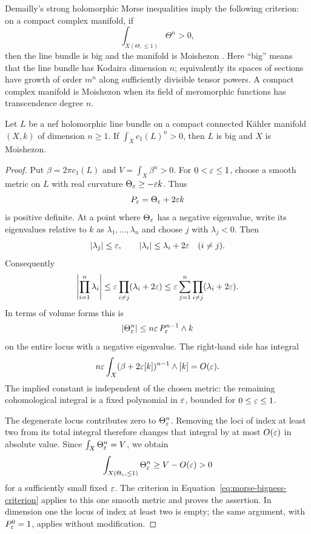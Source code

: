 Demailly's strong holomorphic Morse inequalities
\cite[Theorem~0.1 and Equation~(0.7)]{Demailly1985} imply the following
criterion: on a compact complex manifold, if
\begin{equation}
\label{eq:morse-bigness-criterion}
 \int_{X(\Theta,\le1)}\Theta^n>0,
\end{equation}
then the line bundle is big and the manifold is Moishezon
\cite[Theorem~0.8(a)]{Demailly1985}.  Here ``big'' means that the
line bundle has Kodaira dimension $n$; equivalently its spaces of
sections have growth of order $m^n$ along sufficiently divisible
tensor powers.  A compact complex manifold is Moishezon when its field
of meromorphic functions has transcendence degree $n$.

\begin{lemma}
\label{lem:nef-big}
Let $L$ be a nef holomorphic line bundle on a compact connected K\"ahler
manifold $(X,k)$ of dimension $n\ge1$.  If
$\int_Xc_1(L)^n>0$, then $L$ is big and $X$ is Moishezon.
\end{lemma}

\begin{proof}
Put $\beta=2\pi c_1(L)$ and $V=\int_X\beta^n>0$.
For $0<\varepsilon\le1$, choose a smooth metric on $L$ with real curvature
$\Theta_\varepsilon\ge-\varepsilon k$.  Thus
\[
 P_\varepsilon=\Theta_\varepsilon+2\varepsilon k
\]
is positive definite.  At a point where $\Theta_\varepsilon$ has a negative
eigenvalue, write its eigenvalues relative to $k$ as
$\lambda_1,\ldots,\lambda_n$ and choose $j$ with $\lambda_j<0$.
Then
\[
 |\lambda_j|\le\varepsilon,
 \qquad
 |\lambda_i|\le\lambda_i+2\varepsilon\quad(i\ne j).
\]
Consequently
\[
 \left|\prod_{i=1}^n\lambda_i\right|
 \le\varepsilon\prod_{i\ne j}(\lambda_i+2\varepsilon)
 \le\varepsilon\sum_{j=1}^n\prod_{i\ne j}(\lambda_i+2\varepsilon).
\]
In terms of volume forms this is
\begin{equation}
\label{eq:negative-index-mass}
 |\Theta_\varepsilon^n|\le n\varepsilon\,P_\varepsilon^{n-1}\wedge k
\end{equation}
on the entire locus with a negative eigenvalue.  The right-hand side
has integral
\[
 n\varepsilon\int_X(\beta+2\varepsilon[k])^{n-1}\wedge[k]=O(\varepsilon).
\]
The implied constant is independent of the chosen metric: the
remaining cohomological integral is a fixed polynomial in $\varepsilon$,
bounded for $0\le\varepsilon\le1$.

The degenerate locus contributes zero to $\Theta_\varepsilon^n$.  Removing
the loci of index at least two from its total integral therefore
changes that integral by at most $O(\varepsilon)$ in absolute value.  Since
$\int_X\Theta_\varepsilon^n=V$, we obtain
\[
 \int_{X(\Theta_\varepsilon,\le1)}\Theta_\varepsilon^n
 \ge V-O(\varepsilon)>0
\]
for a sufficiently small fixed $\varepsilon$.  The criterion in
Equation~\eqref{eq:morse-bigness-criterion} applies to this one smooth metric
and proves the assertion.  In dimension one the locus of index at
least two is empty; the same argument, with $P_\varepsilon^0=1$, applies
without modification.
\end{proof}

